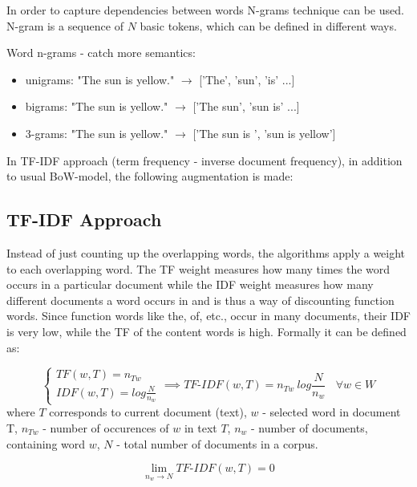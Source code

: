 In order to capture dependencies between words N-grams technique can be used. N-gram is a sequence of $N$ basic tokens, which can be defined in different ways. 


Word n-grams - catch more semantics:
	\begin{itemize}
		\item unigrams: "The sun is yellow." $\rightarrow$ ['The', 'sun', 'is' ...]
		\item bigrams: "The sun is yellow." $\rightarrow$
		['The sun', 'sun is' ...]
		\item 3-grams: "The sun is yellow." $\rightarrow$
		['The sun is ', 'sun is yellow']
	\end{itemize}


In TF-IDF approach (term frequency - inverse document frequency), in addition to usual BoW-model, the following augmentation is made:

\subsection{TF-IDF  Approach} \label{subsect2_1_2}
Instead of just counting up the overlapping words, the algorithms apply a weight to each overlapping word. The TF weight measures how many times the word occurs in a particular document while the IDF weight measures how many different documents a word occurs in and is thus a way of discounting function words. Since function words like the, of, etc., occur in many documents, their IDF is very low, while the TF of the content words is high.\cite[p.647]{jurafsky} Formally it can be defined as: 



\begin{equation}
\label{eq:equation2_2}
\begin{cases} TF(w,T)=n_{Tw} \\ IDF(w, T)= log{\frac{N}{n_{w}}}\end{cases} \implies
TF\text{-}IDF(w, T) = n_{Tw}\ log{\frac{N}{n_{w}}} \ \ \ \ \forall w \in W
\end{equation}
\hfill \break 
where $T$ corresponds to current document (text), \hfill \break 
$w$ - selected word in document T, \hfill \break
$n_{Tw}$ - number of occurences of $w$ in text $T$, \hfill \break
$n_{w}$ - number of documents, containing word $w$, \hfill \break
$N$ - total number of documents in a corpus.

\begin{equation}
\label{eq:equation2_3}
\lim_{n_{w} \to N} {TF\text{-}IDF(w, T)} = 0
\end{equation}

